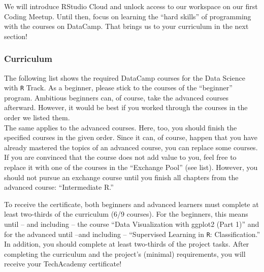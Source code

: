 \documentclass[
  11pt,
]{article}
\begin{document}
We will introduce RStudio Cloud and unlock access to our workspace on our first Coding Meetup. Until then, focus on learning the ``hard skills'' of programming with the courses on DataCamp. That brings us to your curriculum in the next section!

\hypertarget{curriculum}{%
\subsubsection{Curriculum}\label{curriculum}}

The following list shows the required DataCamp courses for the Data Science with \texttt{R} Track. As a beginner, please stick to the courses of the ``beginner'' program. Ambitious beginners can, of course, take the advanced courses afterward. However, it would be best if you worked through the courses in the order we listed them.\\
The same applies to the advanced courses. Here, too, you should finish the specified courses in the given order. Since it can, of course, happen that you have already mastered the topics of an advanced course, you can replace some courses. If you are convinced that the course does not add value to you, feel free to replace it with one of the courses in the ``Exchange Pool'' (see list). However, you should not pursue an exchange course until you finish all chapters from the advanced course: ``Intermediate R.''

To receive the certificate, both beginners and advanced learners must complete at least two-thirds of the curriculum (6/9 courses). For the beginners, this means until -- and including -- the course ``Data Visualization with ggplot2 (Part 1)'' and for the advanced until --and including -- ``Supervised Learning in \texttt{R}: Classification.'' In addition, you should complete at least two-thirds of the project tasks. After completing the curriculum and the project's (minimal) requirements, you will receive your TechAcademy certificate!
\end{document}
